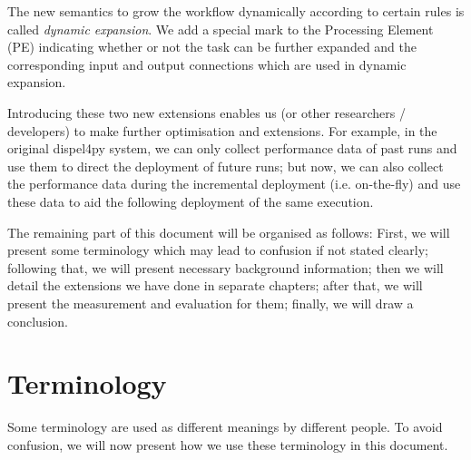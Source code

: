 \documentclass[•]{article}
\begin{document}
	The new semantics to grow the workflow dynamically according to certain rules is called \textit{dynamic expansion}. We add a special mark to the Processing Element (PE) indicating whether or not the task can be further expanded and the corresponding input and output connections which are used in dynamic expansion.
	
	Introducing these two new extensions enables us (or other researchers / developers) to make further optimisation and extensions. For example, in the original dispel4py system, we can only collect performance data of past runs and use them to direct the deployment of future runs; but now, we can also collect the performance data during the incremental deployment (i.e. on-the-fly) and use these data to aid the following deployment of the same execution.
	
	The remaining part of this document will be organised as follows: First, we will present some terminology which may lead to confusion if not stated clearly; following that, we will present necessary background information; then we will detail the extensions we have done in separate chapters; after that, we will present the measurement and evaluation for them; finally, we will draw a conclusion.
	
	\section{Terminology}
	Some terminology are used as different meanings by different people. To avoid confusion, we will now present how we use these terminology in this document.
	
\end{document}

